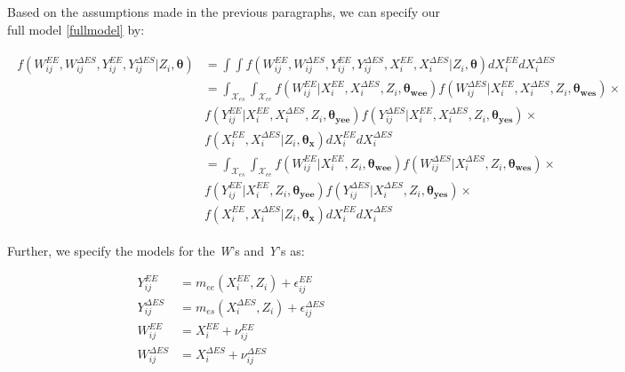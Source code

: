 \documentclass[11pt]{article}\usepackage[]{graphicx}\usepackage[]{color}
\begin{document}
Based on the assumptions made in the previous paragraphs, we can specify our full model \eqref{fullmodel} by:

\begin{align}
  \begin{split}
    \label{truedist}
  f({ W_{ij}^{EE},W_{ij}^{\Delta ES}, Y_{ij}^{EE},Y_{ij}^{\Delta ES}|Z_i},\boldsymbol{\theta}) &= \int \int f({ W_{ij}^{EE},W_{ij}^{\Delta ES}, Y_{ij}^{EE},Y_{ij}^{\Delta ES}, X_i^{EE}, X_i^{\Delta ES}|Z_i},\boldsymbol{\theta}) d{ X_i^{EE}} d{ X_i^{\Delta ES}} \\
    &= \int_{\mathcal{X}_{es}} \int_{\mathcal{X}_{ee}} f({ W_{ij}^{EE}|X_i^{EE},X_i^{\Delta ES},Z_i},\boldsymbol{\theta_{wee}}) f({ W_{ij}^{\Delta ES}|X_i^{EE},X_i^{\Delta ES},Z_i},\boldsymbol{\theta_{wes}}) \times\\
  & f({ Y_{ij}^{EE}|X_i^{EE},X_i^{\Delta ES},Z_i},\boldsymbol{\theta_{yee}}) f({ Y_{ij}^{\Delta ES}|X_i^{EE},X_i^{\Delta ES},Z_i},\boldsymbol{\theta_{yes}}) \times  \\
  & f({ X_i^{EE}, X_i^{\Delta ES}|Z_i},\boldsymbol{\theta_x}) d{ X_i^{EE}} d{ X_i^{\Delta ES}} \\
  &= \int_{\mathcal{X}_{es}} \int_{\mathcal{X}_{ee}} f({ W_{ij}^{EE}|X_i^{EE},Z_i},\boldsymbol{\theta_{wee}}) f({ W_{ij}^{\Delta ES}|X_i^{\Delta ES},Z_i},\boldsymbol{\theta_{wes}}) \times\\
  & f({ Y_{ij}^{EE}|X_i^{EE},Z_i},\boldsymbol{\theta_{yee}}) f({ Y_{ij}^{\Delta ES}|X_i^{\Delta ES},Z_i},\boldsymbol{\theta_{yes}}) \times  \\
  & f({ X_i^{EE}, X_i^{\Delta ES}|Z_i},\boldsymbol{\theta_x}) d{ X_i^{EE}} d{ X_i^{\Delta ES}} 
  \end{split}
\end{align}

Further, we specify the models for the \emph{W}'s and \emph{Y}'s as:

\begin{align}
  \label{regressionfcn1} 
  Y_{ij}^{EE} &= m_{ee}(X_i^{EE} ,Z_i) + \epsilon_{ij}^{EE}  \\
  \label{regressionfcn2}
  Y_{ij}^{\Delta ES} &= m_{es}(X_i^{\Delta ES} ,Z_i) + \epsilon_{ij}^{\Delta ES} \\
  \label{gold1} 
  W_{ij}^{EE} &= X_i^{EE}  + \nu_{ij}^{EE}  \\
  \label{gold2}
  W_{ij}^{\Delta ES} &= X_i^{\Delta ES}  + \nu_{ij}^{\Delta ES} 
\end{align}
\end{document}
